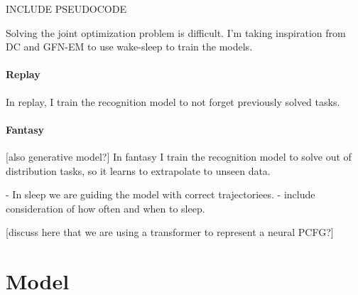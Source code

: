 INCLUDE PSEUDOCODE



Solving the joint optimization problem is difficult. I'm taking inspiration from DC and GFN-EM to use wake-sleep to train the models.
\paragraph{Replay}
In replay, I train the recognition model to not forget previously solved tasks.
\paragraph{Fantasy}
[also generative model?]
In fantasy I train the recognition model to solve out of distribution tasks, so it learns to extrapolate to unseen data.

- In sleep we are guiding the model with correct trajectoriees.
- include consideration of how often and when to sleep. 










































[discuss here that we are using a transformer to represent a neural PCFG?]




\section{Model}


